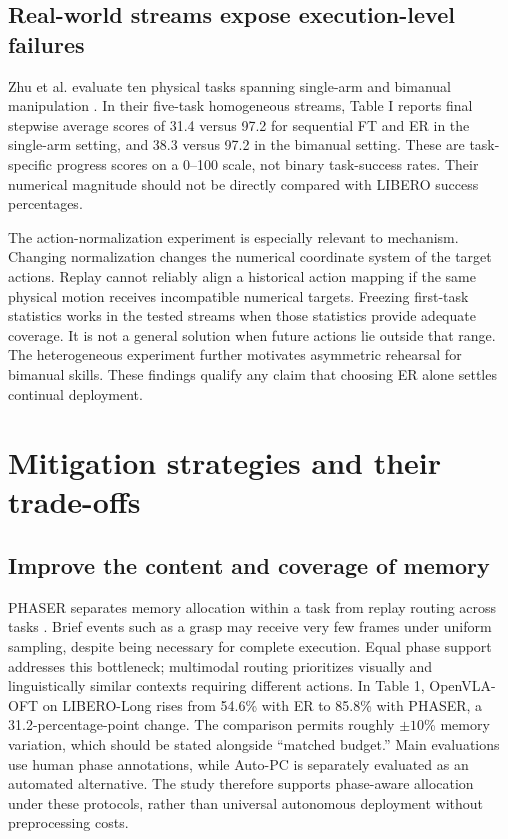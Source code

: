 \documentclass[11pt,a4paper]{article}
\begin{document}
\subsection{Real-world streams expose execution-level failures}
Zhu et al. evaluate ten physical tasks spanning single-arm and bimanual manipulation \cite{zhu_real}. In their five-task homogeneous streams, Table I reports final stepwise average scores of 31.4 versus 97.2 for sequential FT and ER in the single-arm setting, and 38.3 versus 97.2 in the bimanual setting. These are task-specific progress scores on a 0--100 scale, not binary task-success rates. Their numerical magnitude should not be directly compared with LIBERO success percentages.

The action-normalization experiment is especially relevant to mechanism. Changing normalization changes the numerical coordinate system of the target actions. Replay cannot reliably align a historical action mapping if the same physical motion receives incompatible numerical targets. Freezing first-task statistics works in the tested streams when those statistics provide adequate coverage. It is not a general solution when future actions lie outside that range. The heterogeneous experiment further motivates asymmetric rehearsal for bimanual skills. These findings qualify any claim that choosing ER alone settles continual deployment.

\section{Mitigation strategies and their trade-offs}
\subsection{Improve the content and coverage of memory}
PHASER separates memory allocation within a task from replay routing across tasks \cite{phaser}. Brief events such as a grasp may receive very few frames under uniform sampling, despite being necessary for complete execution. Equal phase support addresses this bottleneck; multimodal routing prioritizes visually and linguistically similar contexts requiring different actions. In Table 1, OpenVLA-OFT on LIBERO-Long rises from 54.6\% with ER to 85.8\% with PHASER, a 31.2-percentage-point change. The comparison permits roughly $\pm10$\% memory variation, which should be stated alongside ``matched budget.'' Main evaluations use human phase annotations, while Auto-PC is separately evaluated as an automated alternative. The study therefore supports phase-aware allocation under these protocols, rather than universal autonomous deployment without preprocessing costs.
\end{document}
